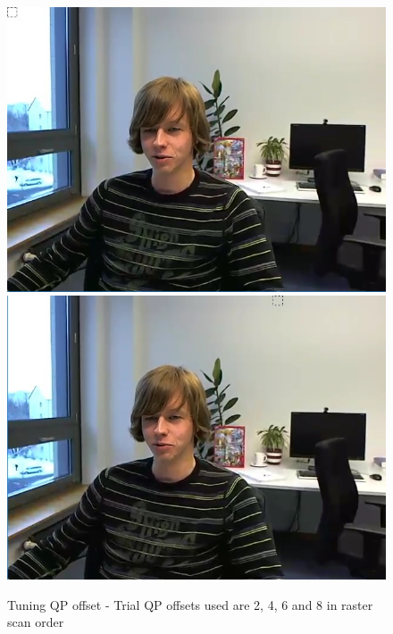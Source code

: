 \documentclass[11pt]{article} %
\begin{document}
\begin{figure}[!h]
    \includegraphics[scale=0.43]{QPOffset/trialOffset/Paul250kbps_offset6}
    \includegraphics[scale=0.43]{QPOffset/trialOffset/Paul250kbps_offset8}  
    \caption{Tuning QP offset - Trial QP offsets used are 2, 4, 6 and 8 in raster scan order}
    \label{fig:Default_QPOffsetTuning}
\end{figure}
\fi
\end{document}
